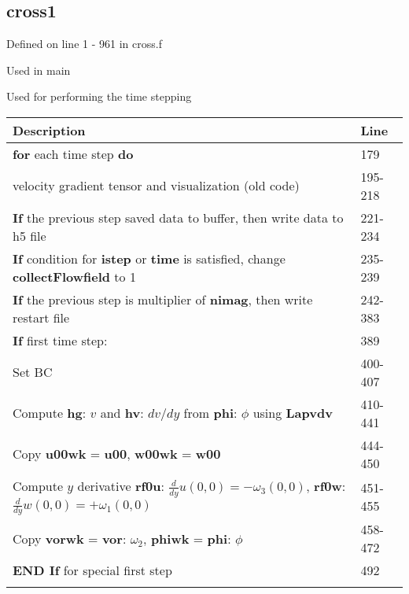 \documentclass[titlepage,12pt,letter]{article}
\numberwithin{equation}{section}
\begin{document}
\subsection{cross1}
Defined on line 1 - 961 in cross.f

Used in main

Used for performing the time stepping

\begin{table}[H]
	\centering 
	\renewcommand{\arraystretch}{1.5} 
	\begin{tabular}{l|l}
		Description& Line \\ \hline
		\textbf{for} each time step \textbf{do} &179\\
		\qquad velocity gradient tensor and visualization (old code)&195-218\\
		\qquad \textbf{If} the previous step saved data to buffer, then write data to h5 file& 221-234\\
		\qquad \textbf{If} condition for \textbf{istep} or \textbf{time} is satisfied, change \textbf{collectFlowfield} to 1&235-239\\
		\qquad \textbf{If} the previous step is multiplier of \textbf{nimag}, then write restart file& 242-383\\ \hdashline
		
		\qquad \textbf{If} first time step: &389\\
		\qquad \qquad  Set BC&400-407\\
		\qquad \qquad Compute \textbf{hg}: $v$ and \textbf{hv}: $dv/dy$ from \textbf{phi}: $\phi$ using \textbf{Lapvdv}&410-441\\
		\qquad \qquad Copy \textbf{u00wk} = \textbf{u00}, \textbf{w00wk} = \textbf{w00}&444-450\\
		\qquad \qquad Compute $y$ derivative \textbf{rf0u}: ${\tfrac{d}{dy} u(0,0) = - \omega_3(0,0)}$, \textbf{rf0w}: ${\tfrac{d}{dy} w(0,0) = + \omega_1(0,0)}$&451-455\\
		\qquad \qquad Copy \textbf{vorwk} = \textbf{vor}: $\omega_2$, \textbf{phiwk} = \textbf{phi}: $\phi$&458-472\\
		\qquad \textbf{END If} for special first step&492\\ \hdashline
		

\end{tabular}
\end{table}
\end{document}
